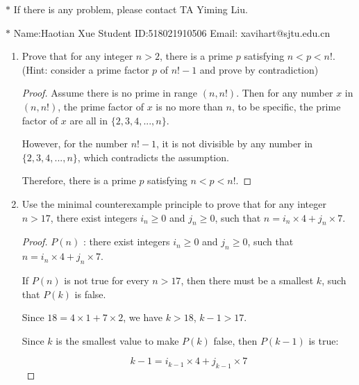 \documentclass[12pt,a4paper]{article}
\theoremstyle{definition}
\begin{document}
\noindent

\noindent{}
\begin{center}
\footnotesize{\color{red}$*$ If there is any problem, please contact TA Yiming Liu.}

\footnotesize{\color{blue}$*$ Name:Haotian Xue  \quad Student ID:518021910506 \quad Email: xavihart@sjtu.edu.cn}
\end{center}

\begin{enumerate}
    \item
    Prove that for any integer $n>2$, there is a prime $p$ satisfying $n<p<n!$. {\color{blue}(Hint: consider a prime factor $p$ of $n!-1$ and prove by contradiction)}
    \begin{proof}
        Assume there is no prime in range $(n, n!)$. Then for any number $x$ in $(n, n!)$, the prime factor of $x$ is no more than $n$, to be specific, the prime factor
        of $x$ are all in $\{2, 3, 4, ..., n\}$. 
        
        However, for the number $n! - 1$, it is not divisible by any number in $\{2, 3, 4, ..., n\}$, 
        which contradicts the assumption.


        Therefore, there is a prime $p$ satisfying $n<p<n!$.
    \end{proof}

    \item
    Use the minimal counterexample principle to prove that for any integer $n>17$, there exist integers $i_n\ge 0$ and $j_n\ge 0$, such that $n = i_n \times 4 + j_n \times 7$.
    \begin{proof}
      $P(n)$ : there exist integers $i_n\ge 0$ and $j_n\ge 0$, such that $n = i_n \times 4 + j_n \times 7$. 
      
      If $P(n)$ is not true for every $n > 17$, then there must be a smallest $k$, such that $P(k)$ is false.
      
      Since $18 = 4 \times 1 + 7 \times 2$, we have $k > 18$, $k - 1 > 17$.

      Since $k$ is the smallest value to make $P(k)$ false, then $P(k - 1)$ is true: 
      
      \begin{equation*}
          k - 1 = i_{k - 1} \times 4 + j_{k - 1} \times 7 
      \end{equation*}
      

\end{proof}
\end{enumerate}
\end{document}
